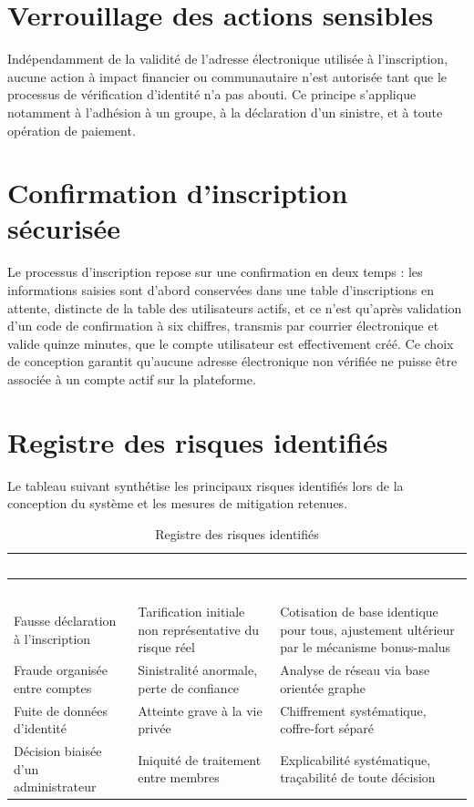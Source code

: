 \documentclass[12pt,a4paper]{report}
\begin{document}
\section{Verrouillage des actions sensibles}
Indépendamment de la validité de l'adresse électronique utilisée à l'inscription, aucune action à impact financier ou communautaire n'est autorisée tant que le processus de vérification d'identité n'a pas abouti. Ce principe s'applique notamment à l'adhésion à un groupe, à la déclaration d'un sinistre, et à toute opération de paiement.

\section{Confirmation d'inscription sécurisée}
Le processus d'inscription repose sur une confirmation en deux temps : les informations saisies sont d'abord conservées dans une table d'inscriptions en attente, distincte de la table des utilisateurs actifs, et ce n'est qu'après validation d'un code de confirmation à six chiffres, transmis par courrier électronique et valide quinze minutes, que le compte utilisateur est effectivement créé. Ce choix de conception garantit qu'aucune adresse électronique non vérifiée ne puisse être associée à un compte actif sur la plateforme.

\section{Registre des risques identifiés}
Le tableau suivant synthétise les principaux risques identifiés lors de la conception du système et les mesures de mitigation retenues.

\begin{longtable}{p{4.2cm}p{4cm}p{4.3cm}}
\caption{Registre des risques identifiés}
\label{tab:risques} \\
\rowcolor{tablehead}
\textcolor{white}{\textbf{Risque}} & \textcolor{white}{\textbf{Impact potentiel}} & \textcolor{white}{\textbf{Mesure de mitigation}} \\
\toprule
\endfirsthead
\rowcolor{tablehead}
\textcolor{white}{\textbf{Risque}} & \textcolor{white}{\textbf{Impact potentiel}} & \textcolor{white}{\textbf{Mesure de mitigation}} \\
\toprule
\endhead
Fausse déclaration à l'inscription & Tarification initiale non représentative du risque réel & Cotisation de base identique pour tous, ajustement ultérieur par le mécanisme bonus-malus \\
Fraude organisée entre comptes & Sinistralité anormale, perte de confiance & Analyse de réseau via base orientée graphe \\
Fuite de données d'identité & Atteinte grave à la vie privée & Chiffrement systématique, coffre-fort séparé \\
Décision biaisée d'un administrateur & Iniquité de traitement entre membres & Explicabilité systématique, traçabilité de toute décision \\
\bottomrule
\end{longtable}
\end{document}
